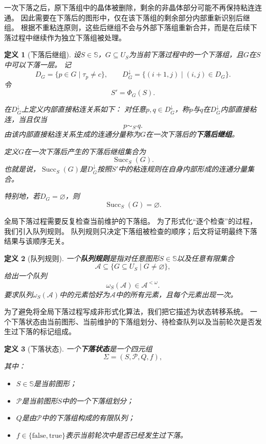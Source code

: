 \documentclass[UTF8,fontset=none]{ctexart}
\theoremstyle{cnthm}
\newtheorem{definition}{定义}[section]
\begin{document}
			一次下落之后，原下落组中的晶体被删除，剩余的非晶体部分可能不再保持粘连连通。
			因此需要在下落后的图形中，仅在该下落组的剩余部分内部重新识别后继组。
			根据不重粘连原则，这些后继组不会与外部下落组重新合并，而是在后续下落过程中继续作为独立下落组被处理。
			
			\begin{definition}[下落后继组]
				设$S\in\mathbb{S}$，$G\subseteq U_S$为当前下落过程中的一个下落组，且$G$在$S$中可以下落一层。
				记
				$$
				D_G=\{p\in G\mid \tau_p\neq c\},
				\qquad
				D_G^\downarrow=\{(i+1,j)\mid (i,j)\in D_G\}.
				$$
				令
				$$
				S'=\Phi_G(S).
				$$
				
				在$D_G^\downarrow$上定义内部直接粘连关系如下：
				对任意$p,q\in D_G^\downarrow$，称$p$与$q$在$D_G^\downarrow$内部直接粘连，当且仅当
				$$
				p\sim_{S'}q.
				$$
				由该内部直接粘连关系生成的连通分量称为$G$在一次下落后的\textbf{下落后继组}。
				
				定义$G$在一次下落后产生的下落后继组集合为
				$$
				\operatorname{Succ}_S(G).
				$$
				也就是说，$\operatorname{Succ}_S(G)$是$D_G^\downarrow$按照$S'$中的粘连规则在自身内部形成的连通分量集合。
				
				特别地，若$D_G=\varnothing$，则
				$$
				\operatorname{Succ}_S(G)=\varnothing.
				$$
			\end{definition}
			
			全局下落过程需要反复检查当前维护的下落组。
			为了形式化“逐个检查”的过程，我们引入队列规则。
			队列规则只决定下落组被检查的顺序；后文将证明最终下落结果与该顺序无关。
			
			\begin{definition}[队列规则]
				一个\textbf{队列规则}是指对任意图形$S\in\mathbb{S}$以及任意有限集合
				$$
				\mathcal{A}\subseteq \{G\subseteq U_S\mid G\neq\varnothing\},
				$$
				给出一个队列
				$$
				\omega_S(\mathcal{A})\in \mathcal{A}^{<\omega}.
				$$
				要求队列$\omega_S(\mathcal{A})$中的元素恰好为$\mathcal{A}$中的所有元素，且每个元素出现一次。
			\end{definition}
			
			为了避免将全局下落过程写成非形式化算法，我们把它描述为状态转移系统。
			一个下落状态由当前图形、当前维护的下落组划分、待检查队列以及当前轮次是否发生过下落的标记组成。
			
			\begin{definition}[下落状态]
				一个\textbf{下落状态}是一个四元组
				$$
				\Sigma=(S,\mathcal{P},Q,f),
				$$
				其中：
				\begin{itemize}
					\item $S\in\mathbb{S}$是当前图形；
					\item $\mathcal{P}$是当前图形$S$中的一个下落组划分；
					\item $Q$是由$\mathcal{P}$中的下落组构成的有限队列；
					\item $f\in\{\mathrm{false},\mathrm{true}\}$表示当前轮次中是否已经发生过下落。
				\end{itemize}
			\end{definition}
			
\end{document}
